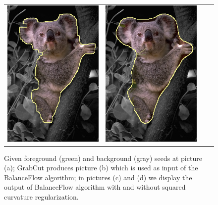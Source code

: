 \begin{figure}
\begin{tabular}{cccc}
 	\includegraphics[scale=0.25]{figures/chapter7/segmentation/coala/k-0.0/corrected-seg.png} &  	
 	\includegraphics[scale=0.25]{figures/chapter7/segmentation/coala/k-1.0/corrected-seg.png}
\end{tabular}	
\caption{Given foreground (green) and background (gray) seeds at picture (a); GrabCut produces picture (b) which is used as input of the BalanceFlow algorithm; in pictures (c) and (d) we display the output of BalanceFlow algorithm with and without squared curvature regularization. }
\label{fig:ch7-segmentation}
\end{figure}


